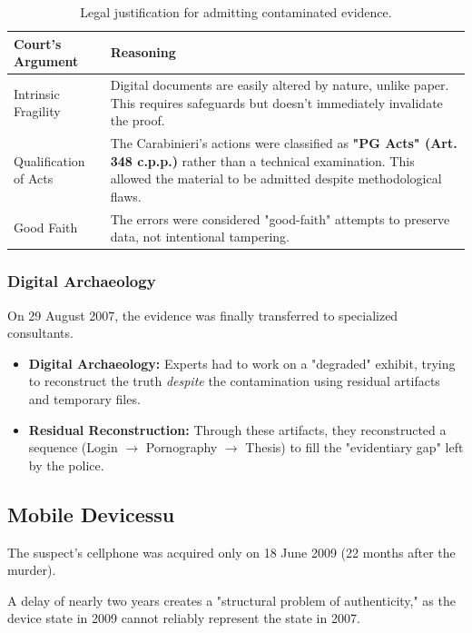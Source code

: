 \begin{table}[H]
\centering
\small
\begin{tabular}{|p{3cm}|p{8cm}|}
\hline
\textbf{Court's Argument} & \textbf{Reasoning} \\
\hline
Intrinsic Fragility & Digital documents are easily altered by nature, unlike paper. This requires safeguards but doesn't immediately invalidate the proof. \\
\hline
Qualification of Acts & The Carabinieri's actions were classified as \textbf{"PG Acts" (Art. 348 c.p.p.)} rather than a technical examination. This allowed the material to be admitted despite methodological flaws. \\
\hline
Good Faith & The errors were considered "good-faith" attempts to preserve data, not intentional tampering. \\
\hline
\end{tabular}
\caption{Legal justification for admitting contaminated evidence.}
\end{table}

\subsubsection{Digital Archaeology}
On 29 August 2007, the evidence was finally transferred to specialized consultants.
\begin{itemize}
    \item \textbf{Digital Archaeology:} Experts had to work on a "degraded" exhibit, trying to reconstruct the truth \textit{despite} the contamination using residual artifacts and temporary files.
    \item \textbf{Residual Reconstruction:} Through these artifacts, they reconstructed a sequence (Login $\rightarrow$ Pornography $\rightarrow$ Thesis) to fill the "evidentiary gap" left by the police.
\end{itemize}

\subsection{Mobile Devicessu}
The suspect's cellphone was acquired only on 18 June 2009 (22 months after the murder).
\medskip

\noindent
A delay of nearly two years creates a "structural problem of authenticity," as the device state in 2009 cannot reliably represent the state in 2007.


